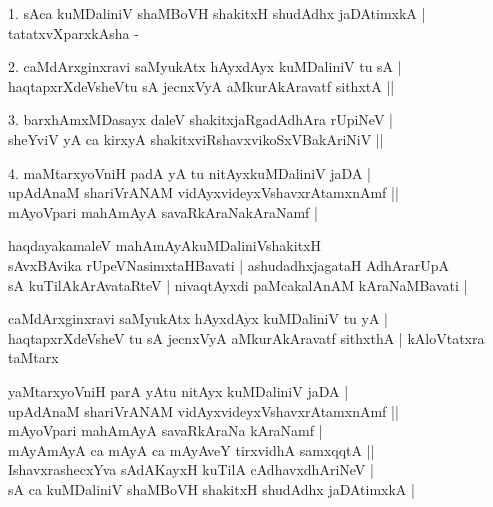 \begin{entry}
\begin{shl}
\end{shl}
\smallskip
\begin{shl}
1. sAca kuMDaliniV shaMBoVH shakitxH shudAdhx jaDAtimxkA | tatatxvXparxkAsha -
\end{shl}
\smallskip
\begin{shl}
2. caMdArxginxravi saMyukAtx hAyxdAyx kuMDaliniV tu sA |\\
haqtapxrXdeVsheVtu sA jecnxVyA aMkurAkAravatf sithxtA ||
\end{shl}
\medskip
{}
\smallskip
\begin{shl}
3. barxhAmxMDasayx daleV shakitxjaRgadAdhAra rUpiNeV |\\
sheYviV yA ca kirxyA shakitxviRshavxvikoSxVBakAriNiV ||
\end{shl}
\smallskip
{}
\smallskip
\begin{shl}
4. maMtarxyoVniH padA yA tu nitAyxkuMDaliniV jaDA |\\
upAdAnaM shariVrANAM vidAyxvideyxVshavxrAtamxnAmf ||\\
mAyoVpari mahAmAyA savaRkAraNakAraNamf |
\end{shl}
\smallskip
{}
\smallskip
\begin{shl}
haqdayakamaleV mahAmAyAkuMDaliniVshakitxH\\
sAvxBAvika rUpeVNasimxtaHBavati | ashudadhxjagataH AdhArarUpA\\
sA kuTilAkArAvataRteV | nivaqtAyxdi paMcakalAnAM kAraNaMBavati |
\end{shl}
\smallskip
\begin{shl}
caMdArxginxravi saMyukAtx hAyxdAyx kuMDaliniV tu yA |\\
haqtapxrXdeVsheV tu sA jecnxVyA aMkurAkAravatf sithxthA | kAloVtatxra taMtarx
\end{shl}
\smallskip
\begin{shl}
yaMtarxyoVniH parA yAtu nitAyx kuMDaliniV jaDA |\\
upAdAnaM shariVrANAM vidAyxvideyxVshavxrAtamxnAmf ||\\
mAyoVpari mahAmAyA savaRkAraNa kAraNamf |\\
mAyAmAyA ca mAyA ca mAyAveY tirxvidhA samxqqtA ||\\
IshavxrashecxYva sAdAKayxH kuTilA cAdhavxdhAriNeV |\\
sA ca kuMDaliniV shaMBoVH shakitxH shudAdhx jaDAtimxkA |
\end{shl}
\smallskip
{}
\end{entry}

